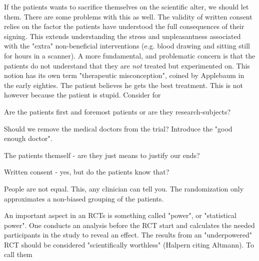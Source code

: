 \documentclass[12p]{article}
\begin{document}
If the patients wants to sacrifice themselves on the scientific alter, we should let them.
There are some problems with this as well.
The validity of written consent relies on the factor the patients have understood the full consequences of their signing.
This extends understanding the stress and unpleasantness associated with the "extra" non-beneficial interventions (e.g. blood drawing and sitting still for hours in a scanner).
A more fundamental, and problematic concern is that the patients do not understand that they are \emph{not} treated but experimented on.
This notion has its own term "therapeutic misconception", coined by Applebaum in the early eighties.
The patient believes he gets the best treatment.
This is not however because the patient is stupid.
Consider for




Are the patients first and foremost patients or are they research-subjects?

Should we remove the medical doctors from the trial? Introduce the "good enough doctor".

The patients themself - are they just means to justify our ends?

Written consent - yes, but do the patients know that?

People are not equal. 
This, any clinician can tell you.
The randomization only approximates a non-biased grouping of the patients.






An important aspect in an RCTs is something called "power", or "statistical power".
One conducts an analysis before the RCT start and calculates the needed participants in the study to reveal an effect.
The results from an "underpowered" RCT should be considered "scientifically worthless" (Halpern citing Altmann). 
To call them 
 
\end{document}
